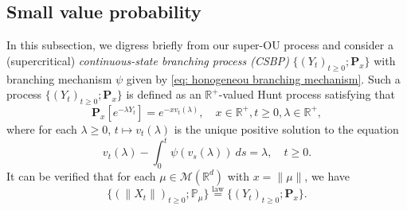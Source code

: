 \documentclass[12pt,a4paper]{amsart}
\theoremstyle{plain}
\theoremstyle{definition}
\numberwithin{equation}{section}
\begin{document}
\subsection{Small value probability}
\label{sec: Small value probability}
    In this subsection, we digress briefly from our super-OU process and consider a (supercritical) \emph{continuous-state branching process (CSBP)} $\{(Y_t)_{t\geq 0}; \mathbf P_x\}$ with branching mechanism $\psi$ given by \eqref{eq: honogeneou branching mechanism}.
    Such a process $\{(Y_t)_{t\geq 0}; \mathbf P_x\}$ is defined as an $\mathbb R^+$-valued Hunt process satisfying that
\[
    \mathbf P_x[e^{-\lambda Y_t}] = e^{- x v_t(\lambda)},
    \quad x\in \mathbb R^+, t\geq 0, \lambda \in \mathbb R^+,
\]
    where for each $\lambda\geq 0$, $t\mapsto v_t(\lambda)$ is the unique positive solution to the equation
\begin{equation}
\label{eq: fkpp equation for CSBP}
    v_t(\lambda) - \int_0^t \psi(v_s(\lambda))~ds = \lambda,
    \quad t\geq 0.
\end{equation}
    It can be verified that for each $\mu \in \mathcal M(\mathbb R^d)$ with $x = \| \mu \|$, we have
\[
    \{(\|X_t\|)_{t\geq 0}; \mathbb P_\mu\}
    \overset{\text{law}}{=} \{(Y_t)_{t\geq 0}; \mathbf P_x\}.
\]
\end{document}
